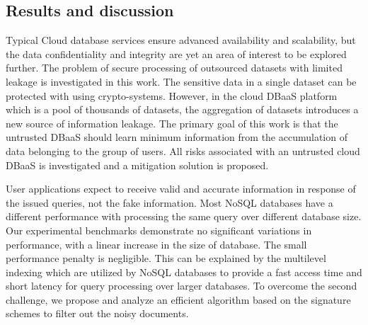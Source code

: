 \subsection{Results and discussion}
\label{subsec:Discussion}

Typical Cloud database services ensure advanced availability and scalability, but the data confidentiality and integrity are yet an area of interest to be explored further. The problem of secure processing of outsourced datasets with limited leakage is investigated in this work. The sensitive data in a single dataset can be protected with using crypto-systems. However, in the cloud DBaaS platform which is a pool of thousands of datasets, the aggregation of datasets introduces a new source of information leakage. The primary goal of this work is that the untrusted DBaaS should learn minimum information from the accumulation of data belonging to the group of users. All risks associated with an untrusted cloud DBaaS is investigated and a mitigation solution is proposed. 

User applications expect to receive valid and accurate information in response of the issued queries, not the fake information. Most NoSQL databases have a different performance with processing the same query over different database size. Our experimental benchmarks demonstrate no significant variations in performance, with a linear increase in the size of database. The small performance penalty is negligible. This can be explained by the multilevel indexing which are utilized by NoSQL databases to provide a fast access time and short latency for query processing over larger databases. To overcome the second challenge, we propose and analyze an efficient algorithm based on the signature schemes to filter out the noisy documents.


